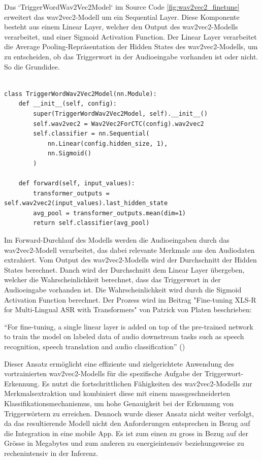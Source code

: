 \documentclass[11pt,a4paper]{article}
\begin{document}
\noindent \newline
Das `TriggerWordWav2Vec2Model` im Source Code \ref{fig:wav2vec2_finetune} erweitert das 
wav2vec2-Modell um ein Sequential Layer. Diese Komponente besteht aus einem Linear Layer, welcher 
den Output des wav2vec2-Modells verarbeitet, und einer Sigmoid Activation Function. Der Linear 
Layer verarbeitet die Average Pooling-Repräsentation der Hidden States des wav2vec2-Modells, um zu 
entscheiden, ob das Triggerwort in der Audioeingabe vorhanden ist oder nicht. So die Grundidee.

\begin{lstlisting}[caption={TriggerWordWav2Vec2Model}, label=fig:wav2vec2_finetune]

class TriggerWordWav2Vec2Model(nn.Module):
	def __init__(self, config):
		super(TriggerWordWav2Vec2Model, self).__init__()
		self.wav2vec2 = Wav2Vec2ForCTC(config).wav2vec2
		self.classifier = nn.Sequential(
			nn.Linear(config.hidden_size, 1),
			nn.Sigmoid()
		)

	def forward(self, input_values):
		transformer_outputs = self.wav2vec2(input_values).last_hidden_state
		avg_pool = transformer_outputs.mean(dim=1)
		return self.classifier(avg_pool)

\end{lstlisting}

\noindent \newline
Im Forward-Durchlauf des Modells werden die Audioeingaben durch das wav2vec2-Modell verarbeitet, 
das dabei relevante Merkmale aus den Audiodaten extrahiert. Vom Output des wav2vec2-Modells wird 
der Durchschnitt der Hidden States berechnet. Danch wird der Durchschnitt dem Linear Layer 
übergeben, welcher die Wahrscheinlichkeit berechnet, dass das Triggerwort in der Audioeingabe
vorhanden ist. Die Wahrscheinlichkeit wird durch die Sigmoid Activation Function berechnet. Der 
Prozess wird im Beitrag "Fine-tuning XLS-R for Multi-Lingual ASR with Transformers" von Patrick 
von Platen beschrieben:

\begin{displayquote}
	``For fine-tuning, a single linear layer is added on top of the pre-trained network to train 
	the model on labeled data of audio downstream tasks such as speech recognition, speech 
	translation and audio classification'' 
	(\cite{platen2021finetune})
\end{displayquote}

\noindent \newline
Dieser Ansatz ermöglicht eine effiziente und zielgerichtete Anwendung des vortrainierten 
wav2vec2-Modells für die spezifische Aufgabe der Triggerwort-Erkennung. Es nutzt die 
fortschrittlichen Fähigkeiten des wav2vec2-Modells zur Merkmalsextraktion und kombiniert 
diese mit einem massgeschneiderten Klassifikationsmechanismus, um hohe Genauigkeit bei der 
Erkennung von Triggerwörtern zu erreichen. Dennoch wurde dieser Ansatz nicht weiter verfolgt, da 
das resultierende Modell nicht den Anforderungen entsprechen in Bezug auf die Integration in eine 
mobile App. Es ist zum einen zu gross in Bezug auf der Grösse in Megabytes und zum anderen zu 
energieintensiv beziehungsweise zu rechenintensiv in der Inferenz. 
\end{document}

